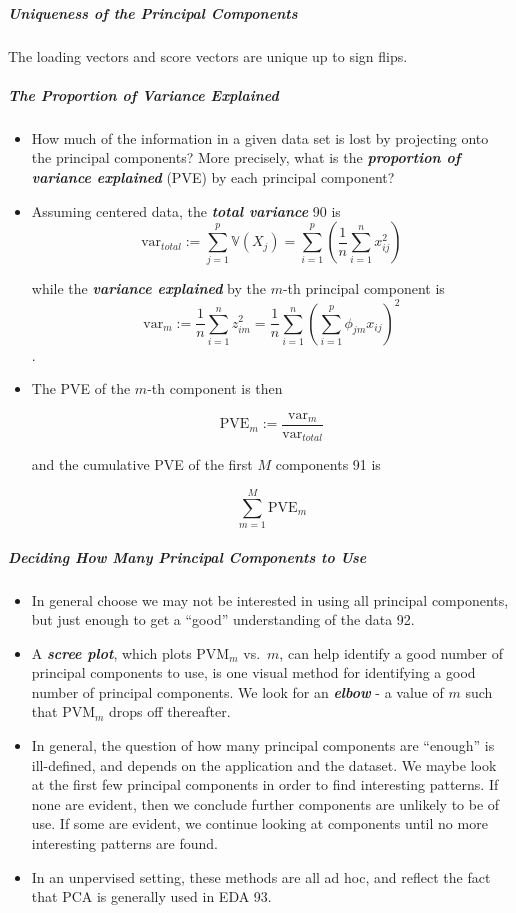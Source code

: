 \documentclass[11pt]{article}
\providecommand{\tightlist}{%
      \setlength{\itemsep}{0pt}\setlength{\parskip}{0pt}}
\begin{document}
    \hypertarget{uniqueness-of-the-principal-components}{%
\subparagraph{Uniqueness of the Principal
Components}\label{uniqueness-of-the-principal-components}}

    The loading vectors and score vectors are unique up to sign flips.

    \hypertarget{the-proportion-of-variance-explained}{%
\subparagraph{The Proportion of Variance
Explained}\label{the-proportion-of-variance-explained}}

    \begin{itemize}
\item
  How much of the information in a given data set is lost by projecting
  onto the principal components? More precisely, what is the
  \textbf{\emph{proportion of variance explained}} (PVE) by each
  principal component?
\item
  Assuming centered data, the \textbf{\emph{total variance}} 90 is
  \[\text{var}_{total} := \sum_{j = 1}^p \mathbb{V}(X_j) = \sum_{i = 1}^p \left(\frac{1}{n} \sum_{i = 1}^n x_{ij}^2 \right)\]

  while the \textbf{\emph{variance explained}} by the \(m\)-th principal
  component is
  \[\text{var}_{m} := \frac{1}{n} \sum_{i=1}^n z_{im}^2 = \frac{1}{n} \sum_{i = 1}^n \left(\sum_{i = 1}^p \phi_{jm}x_{ij} \right)^2 \].
\item
  The PVE of the \(m\)-th component is then

  \[\text{PVE}_m := \frac{\text{var}_{m}}{\text{var}_{total}}\]

  and the cumulative PVE of the first \(M\) components 91 is

  \[\sum_{m = 1}^M \text{PVE}_m \]
\end{itemize}

    \hypertarget{deciding-how-many-principal-components-to-use}{%
\subparagraph{Deciding How Many Principal Components to
Use}\label{deciding-how-many-principal-components-to-use}}

    \begin{itemize}
\tightlist
\item
  In general choose we may not be interested in using all principal
  components, but just enough to get a ``good'' understanding of the
  data 92.
\item
  A \textbf{\emph{scree plot}}, which plots \(\text{PVM}_m\) vs.~\(m\),
  can help identify a good number of principal components to use, is one
  visual method for identifying a good number of principal components.
  We look for an \textbf{\emph{elbow}} - a value of \(m\) such that
  \(\text{PVM}_m\) drops off thereafter.
\item
  In general, the question of how many principal components are
  ``enough'' is ill-defined, and depends on the application and the
  dataset. We maybe look at the first few principal components in order
  to find interesting patterns. If none are evident, then we conclude
  further components are unlikely to be of use. If some are evident, we
  continue looking at components until no more interesting patterns are
  found.
\item
  In an unpervised setting, these methods are all ad hoc, and reflect
  the fact that PCA is generally used in EDA 93.
\end{itemize}
\end{document}
